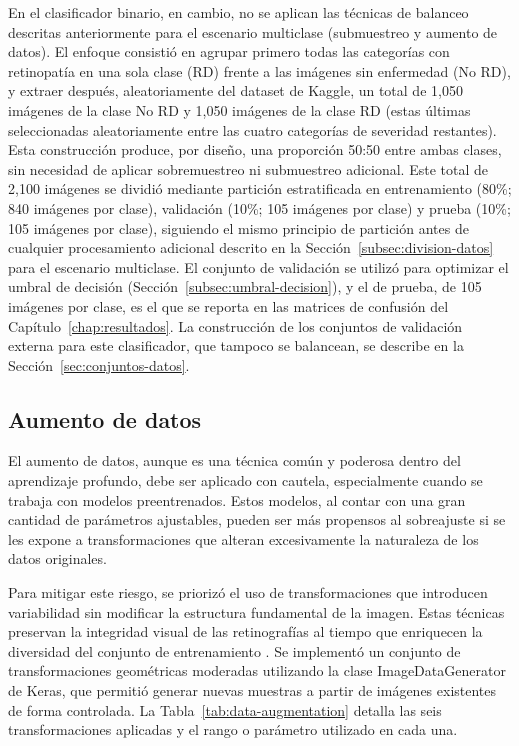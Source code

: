 En el clasificador binario, en cambio, no se aplican las técnicas de balanceo descritas
anteriormente para el escenario multiclase (submuestreo y aumento de datos). El enfoque
consistió en agrupar primero todas las categorías con retinopatía en una sola clase (RD)
frente a las imágenes sin enfermedad (No RD), y extraer después, aleatoriamente del
dataset de Kaggle, un total de 1,050 imágenes de la clase No RD y 1,050 imágenes de la
clase RD (estas últimas seleccionadas aleatoriamente entre las cuatro categorías de
severidad restantes). Esta construcción produce, por diseño, una proporción 50:50 entre
ambas clases, sin necesidad de aplicar sobremuestreo ni submuestreo adicional. Este total
de 2,100 imágenes se dividió mediante partición estratificada en entrenamiento (80\%;
840 imágenes por clase), validación (10\%; 105 imágenes por clase) y prueba (10\%; 105
imágenes por clase), siguiendo el mismo principio de partición antes de cualquier
procesamiento adicional descrito en la Sección~\ref{subsec:division-datos} para el
escenario multiclase. El conjunto de validación se utilizó para optimizar el umbral de
decisión (Sección~\ref{subsec:umbral-decision}), y el de prueba, de 105 imágenes por
clase, es el que se reporta en las matrices de confusión del Capítulo~\ref{chap:resultados}.
La construcción de los conjuntos de validación externa para
este clasificador, que tampoco se balancean, se describe en la
Sección~\ref{sec:conjuntos-datos}.

\subsection{Aumento de datos} \label{subsec:aumento-datos}

El aumento de datos, aunque es una técnica común y poderosa dentro del aprendizaje 
profundo, debe ser aplicado con cautela, especialmente cuando se trabaja con modelos 
preentrenados. Estos modelos, al contar con una gran cantidad de parámetros ajustables, 
pueden ser más propensos al sobreajuste si se les expone a transformaciones que alteran 
excesivamente la naturaleza de los datos originales.

Para mitigar este riesgo, se priorizó el uso de transformaciones que introducen 
variabilidad sin modificar la estructura fundamental de la imagen. Estas técnicas 
preservan la integridad visual de las retinografías al tiempo que enriquecen la 
diversidad del conjunto de entrenamiento . Se implementó un 
conjunto de transformaciones geométricas moderadas utilizando la clase 
ImageDataGenerator de Keras, que permitió generar nuevas muestras a partir de 
imágenes existentes de forma controlada. La Tabla~\ref{tab:data-augmentation} detalla las
seis transformaciones aplicadas y el rango o parámetro utilizado en cada una.


